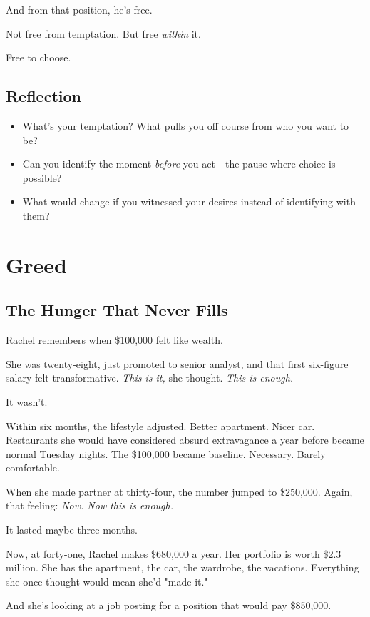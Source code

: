 \documentclass[11pt,twoside]{book}
\begin{document}
And from that position, he's free.

Not free from temptation. But free \emph{within} it.

Free to choose.

\section*{Reflection}

\begin{itemize}
\item What's your temptation? What pulls you off course from who you want to be?
\item Can you identify the moment \emph{before} you act—the pause where choice is possible?
\item What would change if you witnessed your desires instead of identifying with them?
\end{itemize}

\chapter{Greed}

\section*{The Hunger That Never Fills}

Rachel remembers when \$100,000 felt like wealth.

She was twenty-eight, just promoted to senior analyst, and that first six-figure salary felt transformative. \emph{This is it,} she thought. \emph{This is enough.}

It wasn't.

Within six months, the lifestyle adjusted. Better apartment. Nicer car. Restaurants she would have considered absurd extravagance a year before became normal Tuesday nights. The \$100,000 became baseline. Necessary. Barely comfortable.

When she made partner at thirty-four, the number jumped to \$250,000. Again, that feeling: \emph{Now. Now this is enough.}

It lasted maybe three months.

Now, at forty-one, Rachel makes \$680,000 a year. Her portfolio is worth \$2.3 million. She has the apartment, the car, the wardrobe, the vacations. Everything she once thought would mean she'd "made it."

And she's looking at a job posting for a position that would pay \$850,000.
\end{document}
